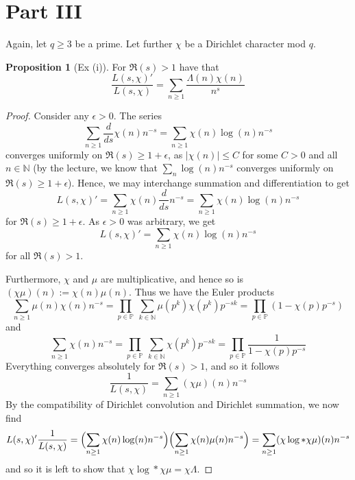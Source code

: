 \documentclass{scrartcl}
\newcommand{\primes}{\mathbb{P}}
\newcommand{\N}{\mathbb{N}}
\theoremstyle{definition}
\newtheorem{proposition}[definition]{Proposition}
\begin{document}
\section{Part III}
Again, let $q \geq 3$ be a prime.
Let further $\chi$ be a Dirichlet character mod $q$.
\begin{proposition}[Ex (i)]
    \label{prop:logarithmic_derivative_L}
    For $\Re(s) > 1$ have that
    \begin{equation*}
        \frac {L(s, \chi)'} {L(s, \chi)} = \sum_{n \geq 1} \frac {\Lambda(n) \chi(n)} {n^s}
    \end{equation*}
\end{proposition}
\begin{proof}
    Consider any $\epsilon > 0$. The series
    \begin{equation*}
        \sum_{n \geq 1} \frac d {ds} \chi(n) n^{-s} = \sum_{n \geq 1} \chi(n) \log(n) n^{-s}
    \end{equation*}
    converges uniformly on $\Re(s) \geq 1 + \epsilon$, as $|\chi(n)| \leq C$ for some $C > 0$ and all $n \in \N$ (by the lecture, we know that $\sum_n \log(n) n^{-s}$ converges uniformly on $\Re(s) \geq 1 + \epsilon$).
    Hence, we may interchange summation and differentiation to get
    \begin{equation*}
        L(s, \chi)' = \sum_{n \geq 1} \chi(n) \frac d {ds} n^{-s} = \sum_{n \geq 1} \chi(n) \log(n) n^{-s}
    \end{equation*}
    for $\Re(s) \geq 1 + \epsilon$.
    As $\epsilon > 0$ was arbitrary, we get
    \begin{equation*}
        L(s, \chi)' = \sum_{n \geq 1} \chi(n) \log(n) n^{-s}
    \end{equation*}
    for all $\Re(s) > 1$.

    Furthermore, $\chi$ and $\mu$ are multiplicative, and hence so is $(\chi\mu)(n) := \chi(n)\mu(n)$.
    Thus we have the Euler products
    \begin{equation*}
        \sum_{n \geq 1} \mu(n) \chi(n) n^{-s} = \prod_{p \in \primes} \ \sum_{k \in \N} \mu(p^k) \chi(p^k) p^{-sk} = \prod_{p \in \primes} (1 - \chi(p)p^{-s})
    \end{equation*}
    and
    \begin{equation*}
        \sum_{n \geq 1} \chi(n) n^{-s} = \prod_{p \in \primes} \ \sum_{k \in \N} \chi(p^k) p^{-sk} = \prod_{p \in \primes} \frac 1 {1 - \chi(p)p^{-s}}
    \end{equation*}
    Everything converges absolutely for $\Re(s) > 1$, and so it follows
    \begin{equation*}
        \frac 1 {L(s, \chi)} = \sum_{n \geq 1} (\chi\mu)(n) n^{-s}
    \end{equation*}
    By the compatibility of Dirichlet convolution and Dirichlet summation, we now find
    \begin{equation*}
        L(s, \chi)' \frac 1 {L(s, \chi)} = \Bigl( \sum_{n \geq 1} \chi(n) \log(n) n^{-s} \Bigr) \Bigl( \sum_{n \geq 1} \chi(n) \mu(n) n^{-s} \Bigr) = \sum_{n \geq 1} (\chi\log * \chi\mu)(n) n^{-s}
    \end{equation*}
    and so it is left to show that $\chi\log * \chi\mu = \chi\Lambda$.


\end{proof}
\end{document}
